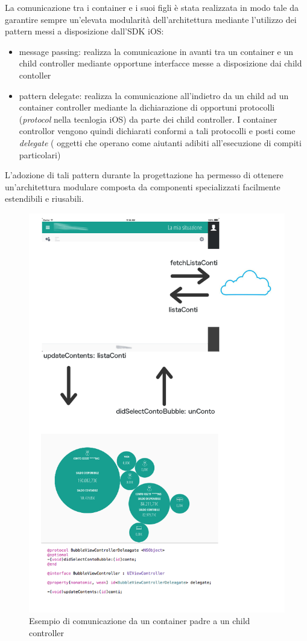 La comunicazione tra i container e i suoi figli è stata realizzata in modo tale da garantire sempre un'elevata modularità dell'architettura mediante l'utilizzo dei pattern messi a disposizione dall'SDK iOS:

\begin{itemize}
 \item message passing: realizza la comunicazione in avanti tra un container e un child controller mediante opportune interfacce messe a disposizione dai child contoller
 \item pattern delegate: realizza la comunicazione all'indietro da un child ad un container controller mediante la dichiarazione di opportuni protocolli (\emph{protocol} nella tecnlogia iOS) da parte dei child controller. I container controllor vengono quindi dichiarati conformi a tali protocolli e posti come \emph{delegate} ( oggetti che operano come aiutanti adibiti all'esecuzione di compiti particolari)
\end{itemize}

L'adozione di tali pattern durante la progettazione ha permesso di ottenere un'architettura modulare composta da componenti specializzati facilmente estendibili e riusabili.

\newpage
\begin{figure}[!htbp]
\centering
\includegraphics[scale=0.6]{dettagli/communication.png}
\caption{Esempio di comunicazione da un container padre a un child controller}
\label{fig:movimenticontainer}
\end{figure}
